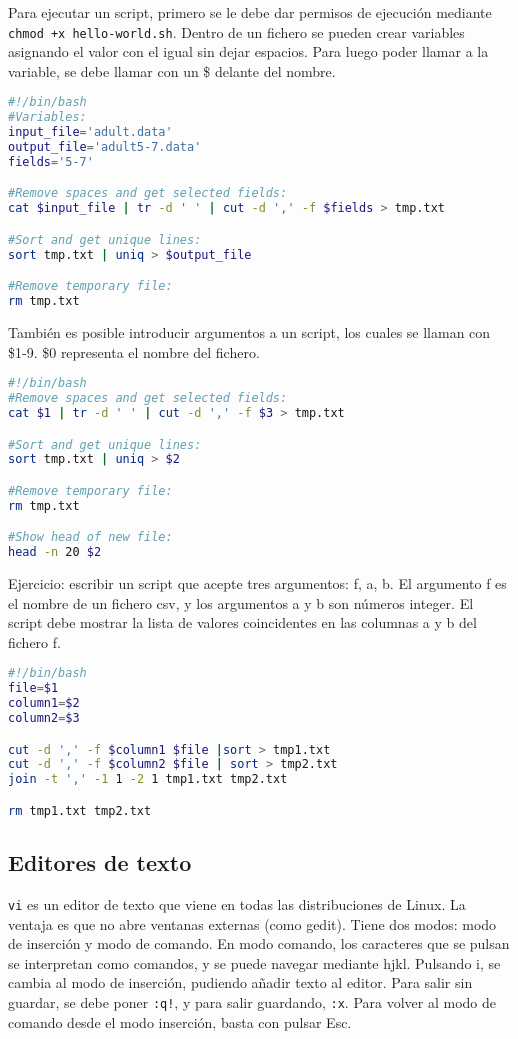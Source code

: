 Para ejecutar un script, primero se le debe dar permisos de ejecución mediante \texttt{chmod +x hello-world.sh}. Dentro de un fichero se pueden crear variables asignando el valor con el igual sin dejar espacios. Para luego poder llamar a la variable, se debe llamar con un \$ delante del nombre.

\begin{lstlisting}[language=bash]
#!/bin/bash
#Variables:
input_file='adult.data'
output_file='adult5-7.data'
fields='5-7'

#Remove spaces and get selected fields:
cat $input_file | tr -d ' ' | cut -d ',' -f $fields > tmp.txt

#Sort and get unique lines:
sort tmp.txt | uniq > $output_file

#Remove temporary file:
rm tmp.txt
\end{lstlisting}

También es posible introducir argumentos a un script, los cuales se llaman con \$1-9. \$0 representa el nombre del fichero.
\begin{lstlisting}[language=bash]
#!/bin/bash
#Remove spaces and get selected fields:
cat $1 | tr -d ' ' | cut -d ',' -f $3 > tmp.txt

#Sort and get unique lines:
sort tmp.txt | uniq > $2

#Remove temporary file:
rm tmp.txt

#Show head of new file:
head -n 20 $2
\end{lstlisting}

Ejercicio: escribir un script que acepte tres argumentos: f, a, b. El argumento f es el nombre de un fichero csv, y los argumentos a y b son números integer. El script debe mostrar la lista de valores coincidentes en las columnas a y b del fichero f.
\begin{lstlisting}[language=bash]
#!/bin/bash
file=$1
column1=$2
column2=$3

cut -d ',' -f $column1 $file |sort > tmp1.txt
cut -d ',' -f $column2 $file | sort > tmp2.txt
join -t ',' -1 1 -2 1 tmp1.txt tmp2.txt

rm tmp1.txt tmp2.txt
\end{lstlisting}

\subsection{Editores de texto}
\texttt{vi} es un editor de texto que viene en todas las distribuciones de Linux. La ventaja es que no abre ventanas externas (como gedit). Tiene dos modos: modo de inserción y modo de comando. En modo comando, los caracteres que se pulsan se interpretan como comandos, y se puede navegar mediante hjkl. Pulsando i, se cambia al modo de inserción, pudiendo añadir texto al editor. Para salir sin guardar, se debe poner \texttt{:q!}, y para salir guardando, \texttt{:x}. Para volver al modo de comando desde el modo inserción, basta con pulsar Esc. 

